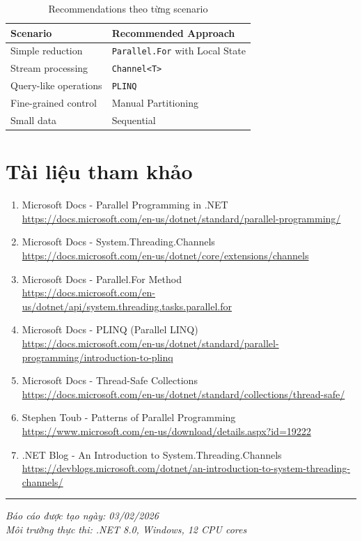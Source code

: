 \documentclass[12pt,a4paper]{article}
\begin{document}
\begin{table}[h]
\centering
\begin{tabular}{|l|l|}
\hline
\textbf{Scenario} & \textbf{Recommended Approach} \\
\hline
Simple reduction & \texttt{Parallel.For} with Local State \\
\hline
Stream processing & \texttt{Channel<T>} \\
\hline
Query-like operations & \texttt{PLINQ} \\
\hline
Fine-grained control & Manual Partitioning \\
\hline
Small data & Sequential \\
\hline
\end{tabular}
\caption{Recommendations theo từng scenario}
\end{table}

\section{Tài liệu tham khảo}

\begin{enumerate}
    \item Microsoft Docs - Parallel Programming in .NET\\
    \url{https://docs.microsoft.com/en-us/dotnet/standard/parallel-programming/}
    
    \item Microsoft Docs - System.Threading.Channels\\
    \url{https://docs.microsoft.com/en-us/dotnet/core/extensions/channels}
    
    \item Microsoft Docs - Parallel.For Method\\
    \url{https://docs.microsoft.com/en-us/dotnet/api/system.threading.tasks.parallel.for}
    
    \item Microsoft Docs - PLINQ (Parallel LINQ)\\
    \url{https://docs.microsoft.com/en-us/dotnet/standard/parallel-programming/introduction-to-plinq}
    
    \item Microsoft Docs - Thread-Safe Collections\\
    \url{https://docs.microsoft.com/en-us/dotnet/standard/collections/thread-safe/}
    
    \item Stephen Toub - Patterns of Parallel Programming\\
    \url{https://www.microsoft.com/en-us/download/details.aspx?id=19222}
    
    \item .NET Blog - An Introduction to System.Threading.Channels\\
    \url{https://devblogs.microsoft.com/dotnet/an-introduction-to-system-threading-channels/}
\end{enumerate}

\vspace{1cm}
\hrule
\vspace{0.5cm}
\begin{center}
\textit{Báo cáo được tạo ngày: 03/02/2026}\\
\textit{Môi trường thực thi: .NET 8.0, Windows, 12 CPU cores}
\end{center}
\end{document}
